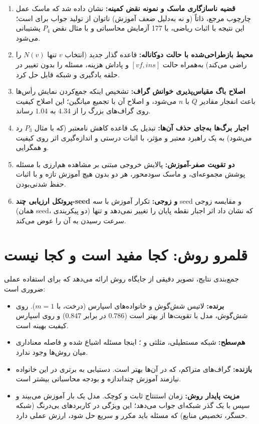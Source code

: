 \begin{enumerate}
  \item \textbf{قضیه ناسازگاری ماسک و نمونه نقض کمینه:} نشان داده شد که ماسک
        عمل چارچوب مرجع، ذاتاً (و نه به‌دلیل ضعف آموزش) ناتوان از تولید جواب
        برای  است؛ این نتیجه با اثبات ریاضی، با \num{177} آزمایش
        محاسباتی و با مثال نقض $P_4$ پشتیبانی می‌شود.
  \item \textbf{محیط بازطراحی‌شده با حالت دوکاناله:} قاعده گذار جدید (انتخاب
        $v$ تنها $N(v)$ را راضی می‌کند) به‌همراه حالت $[vf,ins]$ و پاداش هزینه،
        مسئله را بدون تغییر در حلقه یادگیری و شبکه قابل حل کرد.
  \item \textbf{اصلاح باگ مقیاس‌پذیری خوانش گراف:} تشخیص اینکه جمع‌کردن
        نمایش رأس‌ها باعث انفجار مقادیر $Q$ با $n$ می‌شود، و اصلاح آن با تجمیع
        میانگین؛ این اصلاح کیفیت روی گراف‌های بزرگ را از $4.34$ به $1.04$
        رساند.
  \item \textbf{اجبار برگ‌ها به‌جای حذف آن‌ها:} تبدیل یک قاعده کاهش نامعتبر
        (که با مثال $P_3$ رد می‌شود) به یک راهبرد معتبر و مؤثر، با اثبات درستی
        و اندازه‌گیری اثر روی کیفیت و همگرایی.
  \item \textbf{دو تقویت صفر-آموزش:} پالایش خروجی مبتنی بر مشاهده هم‌ارزی
         با مسئله پوشش مجموعه‌ای، و ماسک  سودمحور، هر دو
        بدون هیچ آموزش تازه و با اثبات حفظ شدنی‌بودن.
  \item \textbf{پروتکل ارزیابی چند-seed و زوجی:} تکرار آموزش با سه seed و
        مقایسه زوجی (همان seed، دو پیکربندی) که نشان داد اثر اجبار نقطه پایان
        را تغییر نمی‌دهد و تنها سرعت رسیدن به آن را عوض می‌کند.
\end{enumerate}

\section{قلمرو روش: کجا مفید است و کجا نیست}
\label{sec:scope}

جمع‌بندی نتایج، تصویر دقیقی از جایگاه روش ارائه می‌دهد که برای استفاده عملی
ضروری است:

\begin{itemize}
  \item \textbf{برنده:} لاتیس شش‌گوش و خانواده‌های اسپارس (درخت،  با
        $m=1$). روی شش‌گوش، مدل با تقویت‌ها از  بهتر است
        ($0.786$ در برابر $0.847$) و روی اسپارس کیفیت بهینه است.
  \item \textbf{هم‌سطح:} شبکه مستطیلی، مثلثی و ؛ اینجا مسئله اشباع شده و
        فاصله معناداری میان روش‌ها وجود ندارد.
  \item \textbf{بازنده:} گراف‌های  متراکم، که  در آن‌ها بهتر
        است. دستیابی به برتری در این خانواده نیازمند آموزش چند‌اندازه و بودجه
        محاسباتی بیشتر است.
  \item \textbf{مزیت پایدار روش:} زمان استنتاج ثابت و کوچک. مدل یک بار آموزش
        می‌بیند و سپس با یک گذر شبکه‌ای جواب می‌دهد؛ این ویژگی در کاربردهای
        بی‌درنگ (شبکه حسگر، تخصیص منابع) که مسئله باید مکرر و سریع حل شود،
        ارزش عملی دارد.
\end{itemize}

